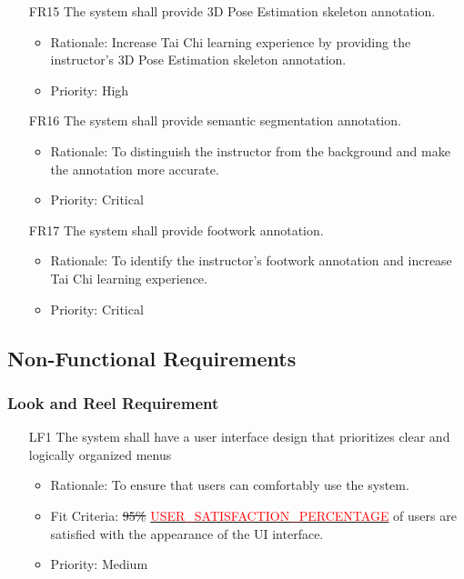 \documentclass[12pt]{article}
\begin{document}
\begin{itemize}
\color{red}
    \item[FR15] The system shall provide 3D Pose Estimation skeleton annotation.  \label{FR15}
    \begin{itemize}
        \item Rationale: Increase Tai Chi learning experience by providing the instructor's 3D Pose Estimation skeleton annotation.
        \item Priority: High
    \end{itemize}
\end{itemize}
\begin{itemize}
\color{red}
    \item[FR16] The system shall provide semantic segmentation annotation.  \label{FR16}
    \begin{itemize}
        \item Rationale: To distinguish the instructor from the background and make the annotation more accurate.
        \item Priority: Critical
    \end{itemize}
\end{itemize}
\begin{itemize}
    \color{red}
        \item[FR17] The system shall provide footwork annotation.  \label{FR17}
        \begin{itemize}
            \item Rationale: To identify the instructor's footwork annotation and increase Tai Chi learning experience.
            \item Priority: Critical
        \end{itemize}
    \end{itemize}
\subsection{Non-Functional Requirements}

\subsubsection{Look and Reel Requirement}
\begin{itemize}
    \item[LF1] The system shall have a user interface design that prioritizes clear and logically organized menus \label{LF1}
    \begin{itemize}
        \item Rationale: To ensure that users can comfortably use the system.
        \item Fit Criteria: \sout{95\%} \hyperref[sec:symbolic-constants]{\textcolor{red}{USER\_SATISFACTION\_PERCENTAGE}} of users are satisfied with the appearance of the UI interface.
        \item Priority: Medium
    \end{itemize}
\end{itemize}
\end{document}
